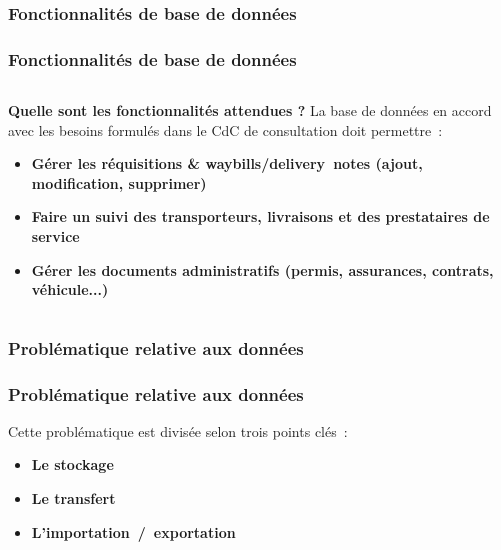 \subsubsection{Fonctionnalités de base de données}
\begin{frame}
\frametitle{Fonctionnalités de base de données}
\begin{columns}[c]
\begin{column}{12cm}
\begin{block}{\textbf{Quelle sont les fonctionnalités attendues ?}}
La base de données en accord avec les besoins formulés dans le CdC de consultation doit permettre~:
\begin{itemize}
\item<2-> \textbf{Gérer les réquisitions \& waybills/delivery~notes (ajout, modification, supprimer)}
\item<3-> \textbf{Faire un suivi des transporteurs, livraisons et des prestataires de service}
\item<4-> \textbf{Gérer les documents administratifs (permis, assurances, contrats, véhicule...)}
\end{itemize}
\end{block}
\end{column}
\end{columns}
\end{frame}

\subsubsection{Problématique relative aux données}
\begin{frame}
\frametitle{Problématique relative aux données}
Cette problématique est divisée selon trois points clés~:
\begin{itemize}
	\item<2-> \textbf{Le stockage}
	\item<3-> \textbf{Le transfert}
	\item<4-> \textbf{L'importation~/~exportation}
\end{itemize}
\end{frame}

